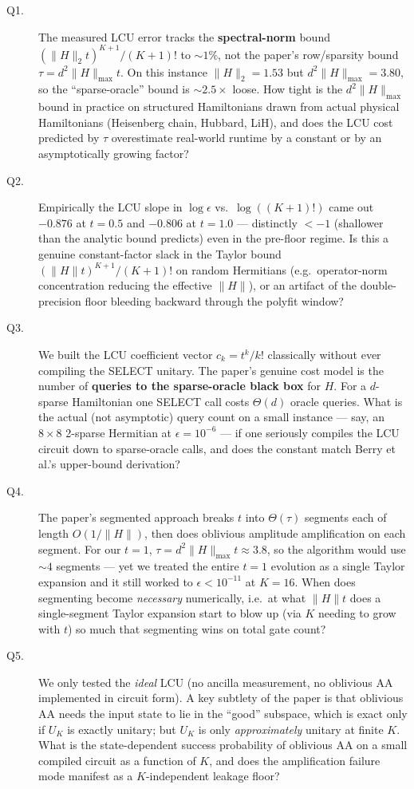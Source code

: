 \documentclass[11pt]{article}
\begin{document}
\begin{description}
\item[Q1.] The measured LCU error tracks the \textbf{spectral-norm} bound $(\|H\|_2 t)^{K+1}/(K+1)!$ to $\sim1\%$, not the paper's row/sparsity bound $\tau = d^2\|H\|_{\max} t$. On this instance $\|H\|_2 = 1.53$ but $d^2\|H\|_{\max} = 3.80$, so the ``sparse-oracle'' bound is $\sim2.5\times$ loose. How tight is the $d^2\|H\|_{\max}$ bound in practice on structured Hamiltonians drawn from actual physical Hamiltonians (Heisenberg chain, Hubbard, LiH), and does the LCU cost predicted by $\tau$ overestimate real-world runtime by a constant or by an asymptotically growing factor?

\item[Q2.] Empirically the LCU slope in $\log\epsilon$ vs.\ $\log((K+1)!)$ came out $-0.876$ at $t=0.5$ and $-0.806$ at $t=1.0$ --- distinctly $<-1$ (shallower than the analytic bound predicts) even in the pre-floor regime. Is this a genuine constant-factor slack in the Taylor bound $(\|H\|t)^{K+1}/(K+1)!$ on random Hermitians (e.g.\ operator-norm concentration reducing the effective $\|H\|$), or an artifact of the double-precision floor bleeding backward through the polyfit window?

\item[Q3.] We built the LCU coefficient vector $c_k = t^k/k!$ classically without ever compiling the SELECT unitary. The paper's genuine cost model is the number of \textbf{queries to the sparse-oracle black box} for $H$. For a $d$-sparse Hamiltonian one SELECT call costs $\Theta(d)$ oracle queries. What is the actual (not asymptotic) query count on a small instance --- say, an $8\times 8$ 2-sparse Hermitian at $\epsilon=10^{-6}$ --- if one seriously compiles the LCU circuit down to sparse-oracle calls, and does the constant match Berry et al.'s upper-bound derivation?

\item[Q4.] The paper's segmented approach breaks $t$ into $\Theta(\tau)$ segments each of length $O(1/\|H\|)$, then does oblivious amplitude amplification on each segment. For our $t=1$, $\tau = d^2\|H\|_{\max} t \approx 3.8$, so the algorithm would use $\sim 4$ segments --- yet we treated the entire $t=1$ evolution as a single Taylor expansion and it still worked to $\epsilon<10^{-11}$ at $K=16$. When does segmenting become \emph{necessary} numerically, i.e.\ at what $\|H\|t$ does a single-segment Taylor expansion start to blow up (via $K$ needing to grow with $t$) so much that segmenting wins on total gate count?

\item[Q5.] We only tested the \emph{ideal} LCU (no ancilla measurement, no oblivious AA implemented in circuit form). A key subtlety of the paper is that oblivious AA needs the input state to lie in the ``good'' subspace, which is exact only if $U_K$ is exactly unitary; but $U_K$ is only \emph{approximately} unitary at finite $K$. What is the state-dependent success probability of oblivious AA on a small compiled circuit as a function of $K$, and does the amplification failure mode manifest as a $K$-independent leakage floor?
\end{description}
\end{document}
